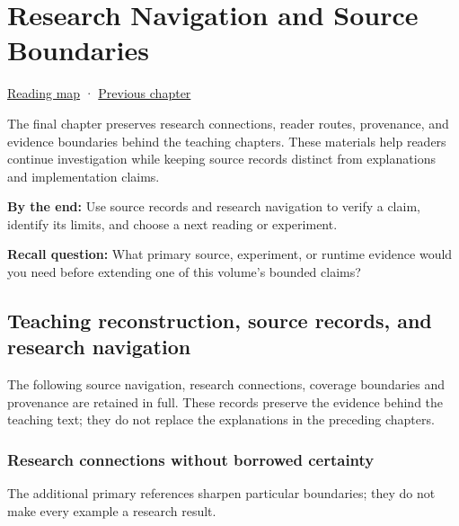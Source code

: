 \hypertarget{02-foundations-ii-ch039}{}
\chapter{Research Navigation and Source Boundaries}\label{02-foundations-ii-ch039-research-navigation-and-source-boundaries}

\hyperref[volume-reading-map]{Reading map} · \hyperref[02-foundations-ii-ch038-reconstruct-the-complete-geometry-pipeline]{Previous chapter}

The final chapter preserves research connections, reader routes, provenance, and evidence boundaries behind the teaching chapters. These materials help readers continue investigation while keeping source records distinct from explanations and implementation claims.

\textbf{By the end:} Use source records and research navigation to verify a claim, identify its limits, and choose a next reading or experiment.

\textbf{Recall question:} What primary source, experiment, or runtime evidence would you need before extending one of this volume's bounded claims?

\section{Teaching reconstruction, source records, and research navigation}\label{02-foundations-ii-ch039-teaching-reconstruction-source-records-and-research-navigation}

The following source navigation, research connections, coverage boundaries and provenance are retained in full. These records preserve the evidence behind the teaching text; they do not replace the explanations in the preceding chapters.

\subsection{Research connections without borrowed certainty}\label{02-foundations-ii-ch039-research-connections-without-borrowed-certainty}

The additional primary references sharpen particular boundaries; they do not make every example a research result.

